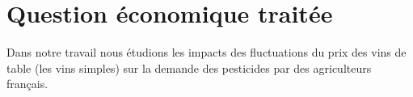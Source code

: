 \documentclass[11pt, a4paper]{article}
\begin{document}
\section{Question économique traitée}
Dans notre travail nous étudions les impacts des fluctuations du prix des vins de table (les vins simples) sur la demande des pesticides par des agriculteurs français.

\end{document}
